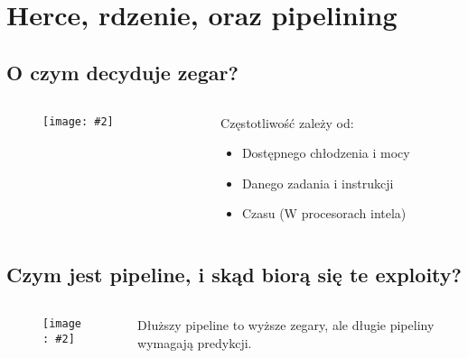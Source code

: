 \documentclass[aspectratio=169]{beamer}
\newcommand{\obrazek}[2]{
\begin{figure}[h]
    \centering
    \texttt{[image: \#2]}
\end{figure}
}
\begin{document}
\section{Herce, rdzenie, oraz pipelining}
\subsection{O czym decyduje zegar?}
\begin{frame}
    \begin{columns}
        \begin{column}{.7\textwidth}
            \obrazek{.4}{boost.png}
        \end{column}
        \begin{column}{.3\textwidth}
            Częstotliwość zależy od:
            \begin{itemize}
                \item Dostępnego chłodzenia i mocy
                \item Danego zadania i instrukcji
                \item Czasu (W procesorach intela)
            \end{itemize}
        \end{column}
    \end{columns}
\end{frame}

\subsection{Czym jest pipeline, i skąd biorą się te exploity?}
\begin{frame}
    \begin{columns}
        \begin{column}{.5\textwidth}
            \obrazek{.4}{pipeline.png}
        \end{column}
        \begin{column}{.5\textwidth}
            Dłuższy pipeline to wyższe zegary, ale długie pipeliny wymagają predykcji.
        \end{column}
    \end{columns}
\end{frame}
\end{document}
